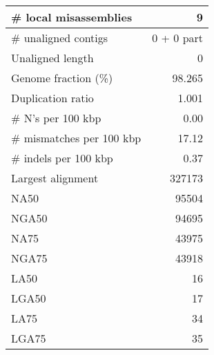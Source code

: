 \documentclass[12pt,a4paper]{article}
\begin{document}
\begin{table}[ht]
\begin{center}
\begin{tabular}{|l*{1}{|r}|}
\# local misassemblies & 9 \\ \hline
\# unaligned contigs & 0 + 0 part \\ \hline
Unaligned length & 0 \\ \hline
Genome fraction (\%) & 98.265 \\ \hline
Duplication ratio & 1.001 \\ \hline
\# N's per 100 kbp & 0.00 \\ \hline
\# mismatches per 100 kbp & 17.12 \\ \hline
\# indels per 100 kbp & 0.37 \\ \hline
Largest alignment & 327173 \\ \hline
NA50 & 95504 \\ \hline
NGA50 & 94695 \\ \hline
NA75 & 43975 \\ \hline
NGA75 & 43918 \\ \hline
LA50 & 16 \\ \hline
LGA50 & 17 \\ \hline
LA75 & 34 \\ \hline
LGA75 & 35 \\ \hline
\end{tabular}
\end{center}
\end{table}
\end{document}
